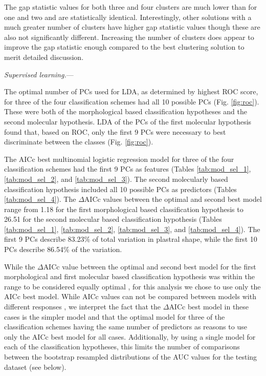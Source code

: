 \documentclass[12pt,letterpaper]{article}\usepackage{graphicx, color}
\renewcommand{\subsubsection}[1]{%
\vspace{2ex}
\noindent
\textit{#1.}---}
\begin{document}
The gap statistic values for both three and four clusters are much lower than for one and two and are statistically identical. Interestingly, other solutions with a much greater number of clusters have higher gap statistic values though these are also not significantly different. Increasing the number of clusters does appear to improve the gap statistic enough compared to the best clustering solution to merit detailed discussion.


\subsubsection{Supervised learning}


The optimal number of PCs used for LDA, as determined by highest ROC score, for three of the four classification schemes had all 10 possible PCs (Fig. \ref{fig:roc}). These were both of the morphological based classification hypotheses and the second molecular hypothesis. LDA of the PCs of the first molecular hypothesis found that, based on ROC, only the first 9 PCs were necessary to best discriminate between the classes (Fig. \ref{fig:roc}). 




The AICc best multinomial logistic regression model for three of the four classification schemes had the first 9 PCs as features (Tables \ref{tab:mod_sel_1}, \ref{tab:mod_sel_2}, and \ref{tab:mod_sel_3}). The second molecularly based classification hypothesis included all 10 possible PCs as predictors (Tables \ref{tab:mod_sel_4}).
The \(\Delta\)AICc values between the optimal and second best model range from 1.18 for the first morphological based classification hypothesis to 26.51 for the second molecular based classification hypothesis (Tables \ref{tab:mod_sel_1}, \ref{tab:mod_sel_2}, \ref{tab:mod_sel_3}, and \ref{tab:mod_sel_4}). The first 9 PCs describe 83.23\% of total variation in plastral shape, while the first 10 PCs describe 86.54\% of the variation.

While the \(\Delta\)AICc value between the optimal and second best model for the first morphological and first molecular based classification hypothesis was within the range to be considered equally optimal \citep{Burnham2002a}, for this analysis we chose to use only the AICc best model. While AICc values can not be compared between models with different responses \citep{Burnham2002a}, we interpret the fact that the \(\Delta\)AICc best model in these cases is the simpler model and that the optimal model for three of the classification schemes having the same number of predictors as reasons to use only the AICc best model for all cases. 
Additionally, by using a single model for each of the classification hypotheses, this limits the number of comparisons between the bootstrap resampled distributions of the AUC values for the testing dataset (see below).
\end{document}
